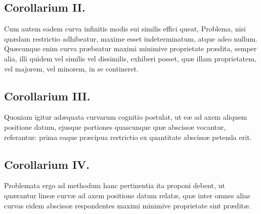 \subsection*{Corollarium II.}
Cum autem eadem curva infinitis modis sui similis effici queat, Problema, nisi quædam restrictio adhibeatur, maxime esset indeterminatum, atque adeo nullum. Quæcunque enim curva præbeatur maximi minimive proprietate prædita, semper alia, illi quidem vel similis vel dissimilis, exhiberi posset, quæ illam proprietatem, vel majorem, vel minorem, in se contineret.

\subsection*{Corollarium III.}
Quoniam igitur adæquata curvarum cognitio postulat, ut eæ ad axem aliquem positione datum, ejusque portiones quascunque quæ abscissæ vocantur, referantur: prima eaque præcipua restrictio ex quantitate abscissæ petenda erit.

\subsection*{Corollarium IV.}
Problemata ergo ad methodum hanc pertinentia ita proponi debent, ut quærantur lineæ curvæ ad axem positione datum relatæ, quæ inter omnes alias curvas eidem abscissæ respondentes maximi minimive proprietate sint præditæ.

